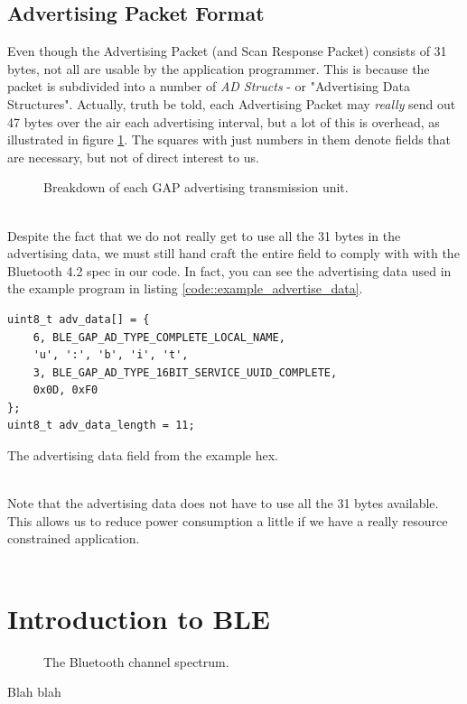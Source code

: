 \documentclass[11pt,a4paper]{article}
\newcommand{\warning}[1]{
\noindent
\fbox{
\begin{minipage}{0.1\linewidth}
\raisebox{-6em}{
\scalebox{3}{%
\makebox[2.1em][c]{%
\makebox[0pt][c]{\raisebox{0.3em}{\large!}}%
\makebox[0pt][c]{\color{red}\Huge$\bigtriangleup$}}}
}
\end{minipage}
\begin{minipage}{0.1\linewidth}
\hfill
\end{minipage}
\begin{minipage}{0.7\linewidth}
\vspace{1em}
#1
\vspace{1em}
\end{minipage}
\begin{minipage}{0.05\linewidth}
\hfill
\end{minipage}
}
}
\begin{document}
\subsection{Advertising Packet Format}
Even though the Advertising Packet (and Scan Response Packet) consists of 31 bytes, not all are usable by the application programmer. This is because the packet is subdivided into a number of \textit{AD Structs} - or "Advertising Data Structures". Actually, truth be told, each Advertising Packet may \textit{really} send out 47 bytes over the air each advertising interval, but a lot of this is overhead, as illustrated in figure \ref{fig::pdu_breakdown}. The squares with just numbers in them denote fields that are necessary, but not of direct interest to us.\\
\begin{figure}[ht]
\centering

\caption{Breakdown of each GAP advertising transmission unit.}
\label{fig::pdu_breakdown}
\end{figure}\\
Despite the fact that we do not really get to use all the 31 bytes in the advertising data, we must still hand craft the entire field to comply with with the Bluetooth 4.2 spec in our code. In fact, you can see the advertising data used in the example program in listing \ref{code::example_advertise_data}.\\
\begin{listing}[hb]
\begin{verbatim}
uint8_t adv_data[] = {
	6, BLE_GAP_AD_TYPE_COMPLETE_LOCAL_NAME,
	'u', ':', 'b', 'i', 't',
	3, BLE_GAP_AD_TYPE_16BIT_SERVICE_UUID_COMPLETE,
	0x0D, 0xF0
};
uint8_t adv_data_length = 11;
\end{verbatim}
\caption{The advertising data field from the example hex.}
\label{code::example_advertise_data}
\end{listing}\\
Note that the advertising data does not have to use all the 31 bytes available. This allows us to reduce power consumption a little if we have a really resource constrained application.
\\
\\
\warning{Hey there!}


\newpage
\noindent
\appendix
\section{Introduction to BLE}
\label{app::intro_ble}
\begin{figure}
\centering
\resizebox{\linewidth}{!}{

}
\caption{The Bluetooth channel spectrum.}
\label{fig::bluetooth_spectrum}
\end{figure}
Blah blah
\end{document}
